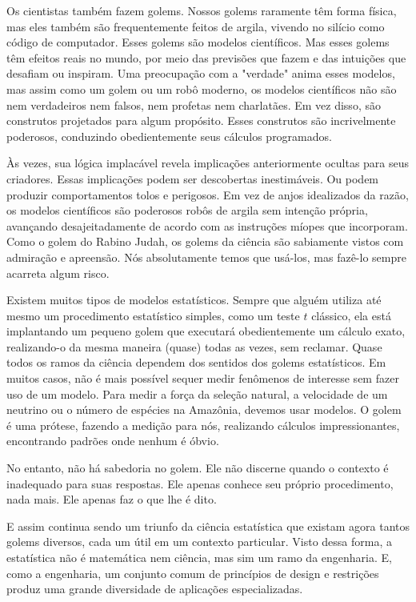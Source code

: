 Os cientistas também fazem golems. Nossos golems raramente têm forma física, mas eles também são frequentemente feitos de argila, vivendo no silício como código de computador. Esses golems são modelos científicos. Mas esses golems têm efeitos reais no mundo, por meio das previsões que fazem e das intuições que desafiam ou inspiram. Uma preocupação com a "verdade" anima esses modelos, mas assim como um golem ou um robô moderno, os modelos científicos não são nem verdadeiros nem falsos, nem profetas nem charlatães. Em vez disso, são construtos projetados para algum propósito. Esses construtos são incrivelmente poderosos, conduzindo obedientemente seus cálculos programados.

Às vezes, sua lógica implacável revela implicações anteriormente ocultas para seus criadores. Essas implicações podem ser descobertas inestimáveis. Ou podem produzir comportamentos tolos e perigosos. Em vez de anjos idealizados da razão, os modelos científicos são poderosos robôs de argila sem intenção própria, avançando desajeitadamente de acordo com as instruções míopes que incorporam. Como o golem do Rabino Judah, os golems da ciência são sabiamente vistos com admiração e apreensão. Nós absolutamente temos que usá-los, mas fazê-lo sempre acarreta algum risco.

Existem muitos tipos de modelos estatísticos. Sempre que alguém utiliza até mesmo um procedimento estatístico simples, como um teste $t$ clássico, ela está implantando um pequeno golem que executará obedientemente um cálculo exato, realizando-o da mesma maneira (quase) todas as vezes, sem reclamar. Quase todos os ramos da ciência dependem dos sentidos dos golems estatísticos. Em muitos casos, não é mais possível sequer medir fenômenos de interesse sem fazer uso de um modelo. Para medir a força da seleção natural, a velocidade de um neutrino ou o número de espécies na Amazônia, devemos usar modelos. O golem é uma prótese, fazendo a medição para nós, realizando cálculos impressionantes, encontrando padrões onde nenhum é óbvio.

No entanto, não há sabedoria no golem. Ele não discerne quando o contexto é inadequado para suas respostas. Ele apenas conhece seu próprio procedimento, nada mais. Ele apenas faz o que lhe é dito.

E assim continua sendo um triunfo da ciência estatística que existam agora tantos golems diversos, cada um útil em um contexto particular. Visto dessa forma, a estatística não é matemática nem ciência, mas sim um ramo da engenharia. E, como a engenharia, um conjunto comum de princípios de design e restrições produz uma grande diversidade de aplicações especializadas.

